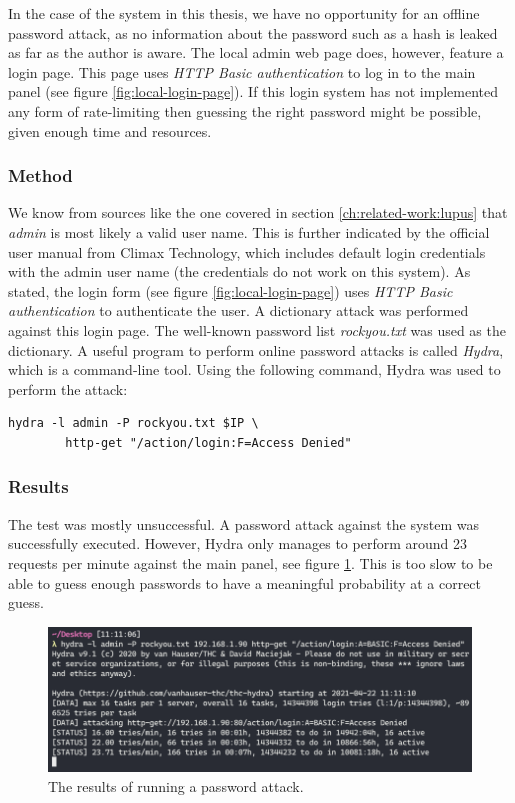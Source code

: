 In the case of the system in this thesis, we have no opportunity for an offline password attack, as no information about the password such as a hash is leaked as far as the author is aware. The local admin web page does, however, feature a login page. This page uses \textit{HTTP Basic authentication} to log in to the main panel (see figure \ref{fig:local-login-page}). If this login system has not implemented any form of rate-limiting then guessing the right password might be possible, given enough time and resources.

\subsubsection{Method}
We know from sources like the one covered in section \ref{ch:related-work:lupus} that \textit{admin} is most likely a valid user name. This is further indicated by the official user manual from Climax Technology, which includes default login credentials with the admin user name (the credentials do not work on this system). As stated, the login form (see figure \ref{fig:local-login-page}) uses \textit{HTTP Basic authentication} to authenticate the user. A dictionary attack was performed against this login page. The well-known password list \textit{rockyou.txt} was used as the dictionary. A useful program to perform online password attacks is called \textit{Hydra}, which is a command-line tool. Using the following command, Hydra was used to perform the attack:
\begin{lstlisting}[frame=tb]
    hydra -l admin -P rockyou.txt $IP \
        http-get "/action/login:F=Access Denied"
\end{lstlisting}

\subsubsection{Results}
The test was mostly unsuccessful. A password attack against the system was successfully executed. However, Hydra only manages to perform around 23 requests per minute against the main panel, see figure \ref{fig:hydra-password-attack}. This is too slow to be able to guess enough passwords to have a meaningful probability at a correct guess.
\begin{figure}[!ht]
    \centering
    \includegraphics[width=\textwidth]{images/6-pentesting/hydra-results.png}
    \caption{The results of running a password attack.}
    \label{fig:hydra-password-attack}
\end{figure}

